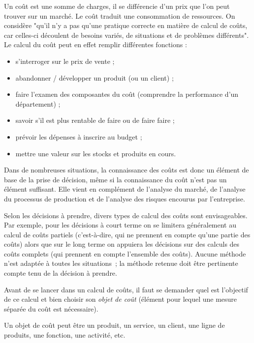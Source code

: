 \documentclass[oneside]{kaobook}
\begin{document}
Un coût est une somme de charges, il se différencie d'un prix que l'on peut trouver sur un marché. Le coût traduit une consommation de ressources. On considère "qu'il n'y a pas qu'une pratique correcte en matière de calcul de coûts, car celles-ci découlent de besoins variés, de situations et de problèmes différents". Le calcul du coût peut en effet remplir différentes fonctions :
\begin{itemize}
\item s’interroger sur le prix de vente ;
\item abandonner / développer un produit (ou un client) ;
\item faire l’examen des composantes du coût (comprendre la performance d’un département) ;
\item savoir s’il est plus rentable de faire ou de faire faire ;
\item prévoir les dépenses à inscrire au budget ;
\item mettre une valeur sur les stocks et produits en cours.
\end{itemize}

Dans de nombreuses situations, la connaissance des coûts est donc un élément de base de la prise de décision, même si la connaissance du coût n'est pas un élément suffisant. Elle vient en complément de l'analyse du marché, de l'analyse du processus de production et de l'analyse des risques encourus par l'entreprise. 

Selon les décisions à prendre, divers types de calcul des coûts sont envisageables. Par exemple, pour les décisions à court terme on se limitera généralement au calcul de coûts partiels (c'est-à-dire, qui ne prennent en compte qu'une partie des coûts) alors que sur le long terme on appuiera les décisions sur des calculs des coûts complets (qui prennent en compte l'ensemble des coûts). Aucune méthode n'est adaptée à toutes les situations ; la méthode retenue doit être pertinente compte tenu de la décision à prendre. 
\begin{kaowarn}
Avant de se lancer dans un calcul de coûts, il faut se demander quel est l'objectif de ce calcul et bien choisir son \emph{objet de coût} (élément pour lequel une mesure séparée du coût est nécessaire). 
\end{kaowarn}
Un objet de coût peut être un produit, un service, un client, une ligne de produits, une fonction, une activité, etc.
\end{document}

